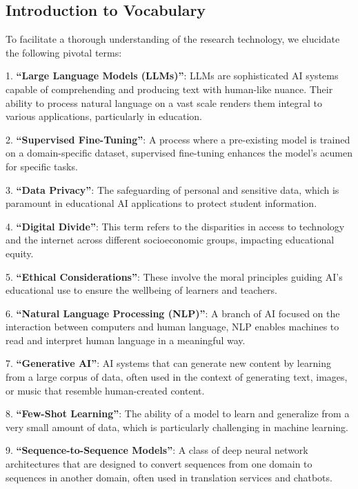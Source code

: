\documentclass[]{article}
\begin{document}
\subsection{Introduction to Vocabulary}

To facilitate a thorough understanding of the research technology, we elucidate the following pivotal terms:

1. \textbf{``Large Language Models (LLMs)''}\cite{aisera-llms}: LLMs are sophisticated AI systems capable of comprehending and producing text with human-like nuance. Their ability to process natural language on a vast scale renders them integral to various applications, particularly in education.

2. \textbf{``Supervised Fine-Tuning''}\cite{microsoft-fine-tuning}: A process where a pre-existing model is trained on a domain-specific dataset, supervised fine-tuning enhances the model's acumen for specific tasks.

3. \textbf{``Data Privacy''}\cite{linkedin-dataprivacy}: The safeguarding of personal and sensitive data, which is paramount in educational AI applications to protect student information.

4. \textbf{``Digital Divide''}\cite{soeonline-digitaldivide}: This term refers to the disparities in access to technology and the internet across different socioeconomic groups, impacting educational equity.

5. \textbf{``Ethical Considerations''}\cite{barrage-ethics}: These involve the moral principles guiding AI's educational use to ensure the wellbeing of learners and teachers.

6. \textbf{``Natural Language Processing (NLP)''}\cite{Deslauriers}: A branch of AI focused on the interaction between computers and human language, NLP enables machines to read and interpret human language in a meaningful way.

7. \textbf{``Generative AI''}\cite{Cozzolino}: AI systems that can generate new content by learning from a large corpus of data, often used in the context of generating text, images, or music that resemble human-created content.

8. \textbf{``Few-Shot Learning''}\cite{Zhu}: The ability of a model to learn and generalize from a very small amount of data, which is particularly challenging in machine learning.

9. \textbf{``Sequence-to-Sequence Models''}\cite{Yu}: A class of deep neural network architectures that are designed to convert sequences from one domain to sequences in another domain, often used in translation services and chatbots.
\end{document}
